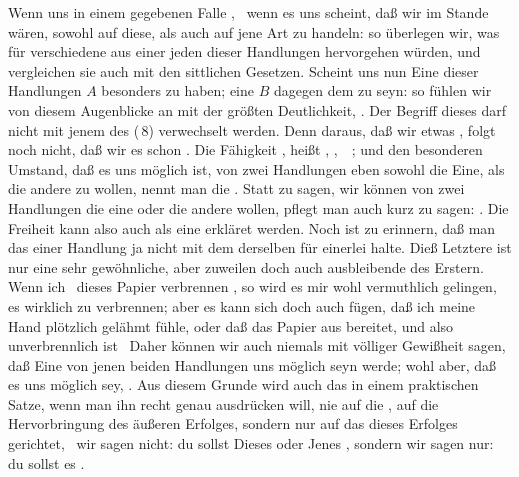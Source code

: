 \begin{aufza}
\item Wenn uns in einem gegebenen Falle , \dh\ wenn es uns scheint, daß wir im Stande wären, sowohl auf diese, als auch auf jene Art zu handeln: so überlegen wir, was für verschiedene  aus einer jeden dieser Handlungen hervorgehen würden, und vergleichen sie auch mit den sittlichen Gesetzen. Scheint uns nun Eine dieser Handlungen $A$ besonders  zu haben; eine  $B$ dagegen dem  zu seyn: so fühlen wir von diesem Augenblicke an mit der größten Deutlichkeit, . Der Begriff dieses  darf nicht mit jenem des  (\no\,8) verwechselt werden. Denn daraus, daß wir etwas , folgt noch nicht, daß wir es schon . Die Fähigkeit , heißt , ,~\ ; und den besonderen Umstand, daß es uns möglich ist, von zwei Handlungen eben sowohl die Eine, als die andere zu wollen, nennt man die . Statt zu sagen, wir können von zwei Handlungen die eine oder die andere wollen, pflegt man auch kurz zu sagen: . Die Freiheit kann also auch als eine  erkläret werden. Noch ist zu erinnern, daß man das  einer Handlung ja nicht mit dem  derselben für einerlei halte. Dieß Letztere ist nur eine sehr gewöhnliche, aber zuweilen doch auch ausbleibende  des Erstern. Wenn ich \zB\ dieses Papier verbrennen , so wird es mir wohl vermuthlich gelingen, es wirklich zu verbrennen; aber es kann sich doch auch fügen, daß ich meine Hand plötzlich gelähmt fühle, oder daß das Papier aus  bereitet, und also unverbrennlich ist \udgl\ Daher können wir auch niemals mit völliger Gewißheit sagen, daß Eine von jenen beiden Handlungen uns möglich seyn werde; wohl aber, daß es uns möglich sey, . Aus diesem Grunde wird auch das  in einem praktischen Satze, wenn man ihn recht genau ausdrücken will, nie auf die , auf die Hervorbringung des äußeren Erfolges, sondern nur auf das  dieses Erfolges gerichtet, \dh\ wir sagen nicht: du sollst Dieses oder Jenes , sondern wir sagen nur: du sollst es .

\end{aufza}
